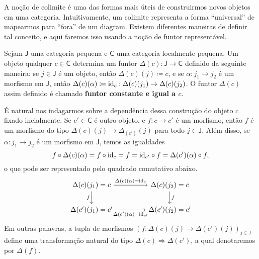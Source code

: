 A noção de colimite é uma das formas mais úteis de construirmos novos objetos em uma categoria.
Intuitivamente, um colimite representa a forma ``universal'' de mapearmos para ``fora'' de um diagram.
Existem diferentes maneiras de definir tal conceito, e aqui faremos isso usando a noção de funtor representável.

Sejam $\mathsf{J}$ uma categoria pequena e $\mathsf{C}$ uma categoria localmente pequena.
Um objeto qualquer $c \in \mathsf{C}$ determina um funtor $\Delta(c): \mathsf{J} \to \mathsf{C}$ definido da seguinte maneira: se $j \in \mathsf{J}$ é um objeto, então $\Delta(c)(j) \coloneqq c$, e se $\alpha: j_1 \to j_2$ é um morfismo em $\mathsf{J}$, então $\Delta(c)(\alpha) \coloneqq \mathrm{id}_c: \Delta(c)(j_1) \to \Delta(c)(j_2)$.
O funtor $\Delta(c)$ assim definido é chamado \textbf{funtor constante e igual a $c$}.

É natural nos indagarmos sobre a dependência dessa construção do objeto $c$ fixado incialmente.
Se $c' \in \mathsf{C}$ é outro objeto, e $f: c \to c'$ é um morfismo, então $f$ é um morfismo do tipo $\Delta(c)(j) \to \Delta_(c')(j)$ para todo $j \in \mathsf{J}$.
Além disso, se $\alpha: j_1 \to j_2$ é um morfismo em $\mathsf{J}$, temos as igualdades
\begin{displaymath}
  f \circ \Delta(c)(\alpha) = f \circ \mathrm{id}_c = f = \mathrm{id}_{c'} \circ f = \Delta(c')(\alpha) \circ f,
\end{displaymath}
o que pode ser representado pelo quadrado comutativo abaixo.
\begin{displaymath}
  \begin{tikzcd}[column sep=1.5cm]
    \Delta(c)(j_1) = c
    \arrow[r, "\Delta(c)(\alpha) = \id_c"]
    \arrow[d, "f" swap]
    & \Delta(c)(j_2) = c
    \arrow[d, "f"]
    \\ \Delta(c')(j_1) = c'
    \arrow[r, "\Delta(c')(\alpha) = \id_{c'}" swap]
    & \Delta(c')(j_2) = c'
  \end{tikzcd}
\end{displaymath}
Em outras palavras, a tupla de morfismos $(f: \Delta(c)(j) \to \Delta(c')(j))_{j \in \mathsf{J}}$ define uma transformação natural do tipo $\Delta(c) \Rightarrow \Delta(c')$, a qual denotaremos por $\Delta(f)$.

